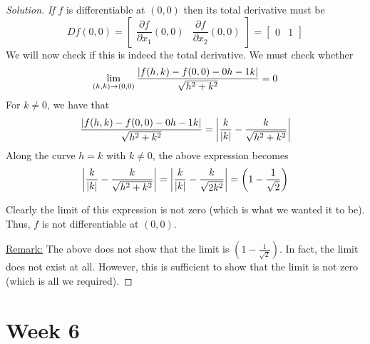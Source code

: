 \documentclass[12pt]{article}
\theoremstyle{definition}
\newenvironment{soln}{\begin{proof}[Solution]}{\end{proof}}
\begin{document}
\begin{enumerate}[leftmargin=*]
\begin{soln}
        \medskip
        
        \emph{If} $f$ is differentiable at $(0,0)$ then its total derivative must be 
        \[
            Df(0,0) = \begin{bmatrix}
                \dfrac{\partial f}{\partial x_1}(0,0) & \dfrac{\partial f}{\partial x_2}(0,0)
            \end{bmatrix} = \begin{bmatrix}
                0 & 1
            \end{bmatrix}
        \]
        We will now check if this is indeed the total derivative. We must check whether 
        \[
            \lim\limits_{(h,k) \to (0,0)} \frac{\abs{f(h,k) - f(0,0) -0h - 1k}}{\sqrt{h^2 + k^2}} = 0
        \]
        For $k \neq 0$, we have that
        \[
             \frac{\abs{f(h,k) - f(0,0) -0h - 1k}}{\sqrt{h^2 + k^2}} = \abs{\frac{k}{\abs{k}} - \frac{k}{\sqrt{h^2+k^2}}}
        \]
        Along the curve $h=k$ with $k\neq 0$, the above expression becomes
        \[
            \abs{\frac{k}{\abs{k}} - \frac{k}{\sqrt{h^2+k^2}}} = \abs{\frac{k}{\abs{k}} - \frac{k}{\sqrt{2k^2}}} = \left( 1 - \frac{1}{\sqrt{2}} \right)
        \]
        
        Clearly the limit of this expression is not zero (which is what we wanted it to be). Thus, $f$ is not differentiable at $(0,0)$. 
        
        \medskip
        
        \underline{Remark:} The above does not show that the limit is $\left( 1 - \frac{1}{\sqrt{2}} \right)$. In fact, the limit does not exist at all. However, this is sufficient to show that the limit is not zero (which is all we required).
    \end{soln}
\end{enumerate}

\newpage\section{Week 6}
\end{document}
